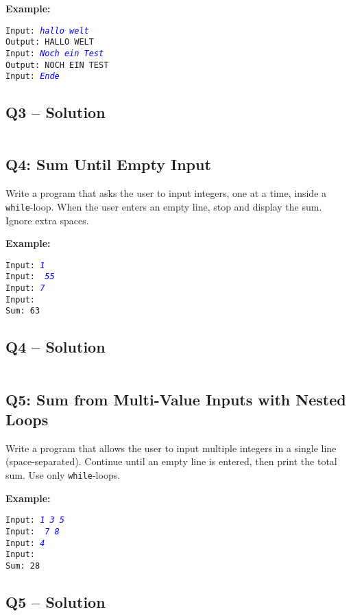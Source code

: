 \documentclass[a4paper,11pt]{article}
\begin{document}
\textbf{Example:}
\begin{flushleft}
	\texttt{Input: \textcolor{blue}{\textit{hallo welt}}}\\
	\texttt{Output: HALLO WELT}\\
	\texttt{Input: \textcolor{blue}{\textit{Noch ein Test}}}\\
	\texttt{Output: NOCH EIN TEST}\\
	\texttt{Input: \textcolor{blue}{\textit{Ende}}}
\end{flushleft}


\subsection*{Q3 – Solution}
\inputminted{python}{Files/5/3.py}

\subsection*{Q4: Sum Until Empty Input}
Write a program that asks the user to input integers, one at a time, inside a \texttt{while}-loop. When the user enters an empty line, stop and display the sum. Ignore extra spaces.

\textbf{Example:}
\begin{flushleft}
	\texttt{Input: \textcolor{blue}{\textit{1}}}\\
	\texttt{Input: \textcolor{blue}{\textit{   55}}}\\
	\texttt{Input: \textcolor{blue}{\textit{7}}}\\
	\texttt{Input: \textcolor{blue}{\textit{}}}\\
	\texttt{Sum: 63}
\end{flushleft}

\subsection*{Q4 – Solution}
\inputminted{python}{Files/5/4.py}

\subsection*{Q5: Sum from Multi-Value Inputs with Nested Loops}
Write a program that allows the user to input multiple integers in a single line (space-separated). Continue until an empty line is entered, then print the total sum. Use only \texttt{while}-loops.

\textbf{Example:}
\begin{flushleft}
	\texttt{Input: \textcolor{blue}{\textit{1 3 5}}}\\
	\texttt{Input: \textcolor{blue}{\textit{   7   8}}}\\
	\texttt{Input: \textcolor{blue}{\textit{4}}}\\
	\texttt{Input: \textcolor{blue}{\textit{}}}\\
	\texttt{Sum: 28}
\end{flushleft}


\subsection*{Q5 – Solution}
\inputminted{python}{Files/5/5.py}




	





	
	
\end{document}
